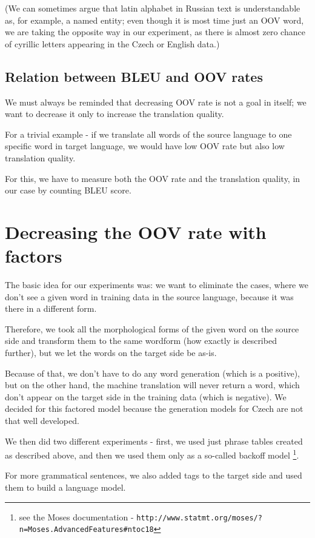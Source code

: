 \documentclass[11pt,letterpaper]{article}
\begin{document}
(We can sometimes argue that latin alphabet in Russian text is understandable as, for example, a named entity; even though it is most time just an OOV word, we are taking the opposite way in our experiment, as there is almost zero chance of cyrillic letters appearing in the Czech or English data.)

\subsection{Relation between BLEU and OOV rates}
We must always be reminded that decreasing OOV rate is not a goal in itself; we want to decrease it only to increase the translation quality.

For a trivial example - if we translate all words of the source language to one specific word in target language, we would have low OOV rate but also low translation quality.

For this, we have to measure both the OOV rate and the translation quality, in our case by counting BLEU score.


\section{Decreasing the OOV rate with factors}
The basic idea for our experiments was: we want to eliminate the cases, where we don't see a given word in training data in the source language, because it was there in a different form.

Therefore, we took all the morphological forms of the given word on the source side and transform them to the same wordform (how exactly is described further), but we let the words on the target side be as-is.

Because of that, we don't have to do any word generation (which is a positive), but on the other hand, the machine translation will never return a word, which don't appear on the target side in the training data (which is negative). We decided for this factored model because the generation models for Czech are not that well developed.

We then did two different experiments - first, we used just phrase tables created as described above, and then we used them only as a so-called backoff model \footnote{see the Moses documentation - \texttt{http://www.statmt.org/moses/?n=Moses.A\-dva\-nced\-Fea\-tu\-res\#ntoc18}}.

For more grammatical sentences, we also added tags to the target side and used them to build a language model.
\end{document}
